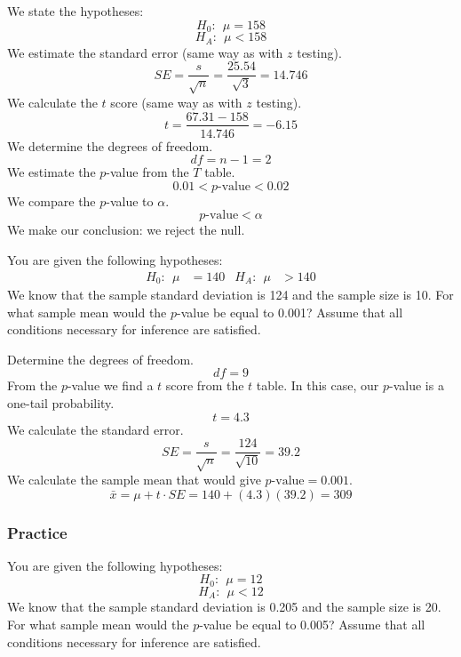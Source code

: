 \documentclass[11pt,containsverbatim,handout]{beamer}
\newcommand{\soln}[1]{ }
\begin{document}
\begin{frame} \small
We state the hypotheses: \[H_0:~~\mu = 158 \] \[H_A:~~\mu < 158 \] We
estimate the standard error (same way as with \(z\) testing).
\[SE = \frac{s}{\sqrt{n}} =  \frac{25.54}{\sqrt{3}} = 14.746\] We
calculate the \(t\) score (same way as with \(z\) testing).
\[t = \frac{67.31-158}{14.746} = -6.15 \] We determine the degrees of
freedom. \[df = n-1 = 2 \] We estimate the \(p\)-value from the \(T\)
table. \[0.01 < p\text{-value} < 0.02 \] We compare the \(p\)-value to
\(\alpha\). \[p\text{-value} < \alpha \] We make our conclusion: we
reject the null.
\end{frame}


\begin{frame}
You are given the following hypotheses: 
\begin{align*}
H_0:~~ \mu &= 140 & H_A:~~ \mu &> 140
\end{align*}
 We know that the sample standard deviation is 124 and the sample size is 10. For what sample mean would the \(p\)-value be equal to 0.001? Assume that all conditions necessary for inference are satisfied. \pause

Determine the degrees of freedom. \pause \[df = 9 \] \pause From the \(p\)-value we
find a \(t\) score from the \(t\) table. In this case, our \(p\)-value
is a one-tail probability.\pause \[t = 4.3 \] \pause We calculate the standard error. \pause
\[SE = \frac{s}{\sqrt{n}} = \frac{124}{\sqrt{10}} = 39.2 \] \pause We calculate
the sample mean that would give \(p\text{-value} = 0.001\). \pause
\[\bar{x} = \mu+t\cdot SE = 140+(4.3)(39.2) = 309 \]
\end{frame}

\begin{frame}
\frametitle{Practice}
You are given the following hypotheses: \[H_0:~~ \mu = 12\]
\[H_A:~~ \mu < 12\] We know that the sample standard deviation is 0.205
and the sample size is 20. For what sample mean would the \(p\)-value be
equal to 0.005? Assume that all conditions necessary for inference are
satisfied.
\pause
\soln{ \[df = 19 \] 

\[t = -2.86 \]

\[SE = \frac{s}{\sqrt{n}} = \frac{0.205}{\sqrt{20}} = 0.0458 \]

\[\bar{x} = \mu+t\cdot SE = 12+(-2.86)(0.0458) = 11.9 \]}

\end{frame}
\end{document}
